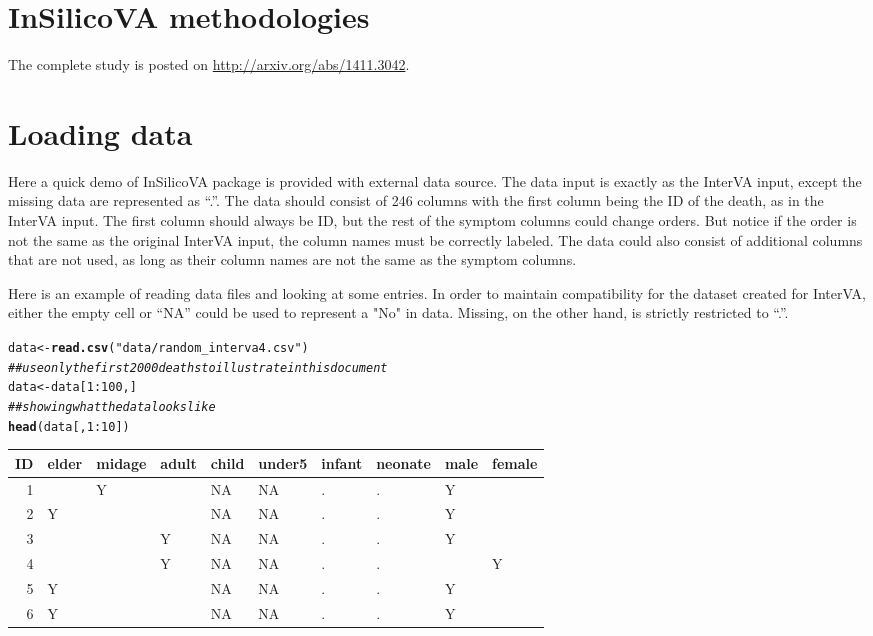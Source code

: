 \documentclass{article}\usepackage[]{graphicx}\usepackage[]{color}
\makeatletter
\newcommand{\hlnum}[1]{\textcolor[rgb]{0.686,0.059,0.569}{#1}}%
\newcommand{\hlstr}[1]{\textcolor[rgb]{0.192,0.494,0.8}{#1}}%
\newcommand{\hlcom}[1]{\textcolor[rgb]{0.678,0.584,0.686}{\textit{#1}}}%
\newcommand{\hlopt}[1]{\textcolor[rgb]{0,0,0}{#1}}%
\newcommand{\hlstd}[1]{\textcolor[rgb]{0.345,0.345,0.345}{#1}}%
\newcommand{\hlkwb}[1]{\textcolor[rgb]{0.69,0.353,0.396}{#1}}%
\newcommand{\hlkwd}[1]{\textcolor[rgb]{0.737,0.353,0.396}{\textbf{#1}}}%
\newenvironment{kframe}{%
 \def\at@end@of@kframe{}%
 \ifinner\ifhmode%
  \def\at@end@of@kframe{\end{minipage}}%
  \begin{minipage}{\columnwidth}%
 \fi\fi%
 \def\FrameCommand##1{\hskip\@totalleftmargin \hskip-\fboxsep
 \colorbox{shadecolor}{##1}\hskip-\fboxsep
     \hskip-\linewidth \hskip-\@totalleftmargin \hskip\columnwidth}%
 \MakeFramed {\advance\hsize-\width
   \@totalleftmargin\z@ \linewidth\hsize
   \@setminipage}}%
 {\par\unskip\endMakeFramed%
 \at@end@of@kframe}
\newenvironment{knitrout}{}{} %
\makeatother
\begin{document}
\section{InSilicoVA methodologies}
The complete study is posted on \url{http://arxiv.org/abs/1411.3042}.

\section{Loading data}
Here a quick demo of InSilicoVA package is provided with external data source. The data input is exactly as the InterVA input, except the missing data are represented as ``.''. The data should consist of 246 columns with the first column being the ID of the death, as in the InterVA input. The first column should always be ID, but the rest of the symptom columns could change orders. But notice if the order is not the same as the original InterVA input, the column names must be correctly labeled. The data could also consist of additional columns that are not used, as long as their column names are not the same as the symptom columns. 

Here is an example of reading data files and looking at some entries. In order to maintain compatibility for the dataset created for InterVA, either the empty cell or ``NA'' could  be used to represent a "No" in data. Missing, on the other hand, is strictly restricted to ``.''.

\begin{knitrout}
\color{fgcolor}\begin{kframe}
\begin{alltt}
\hlstd{data} \hlkwb{<-} \hlkwd{read.csv}\hlstd{(}\hlstr{"data/random_interva4.csv"}\hlstd{)}
\hlcom{## use only the first 2000 deaths to illustrate in this document}
\hlstd{data} \hlkwb{<-} \hlstd{data[}\hlnum{1}\hlopt{:}\hlnum{100}\hlstd{, ]}
\hlcom{## showing what the data looks like}
\hlkwd{head}\hlstd{(data[,} \hlnum{1}\hlopt{:}\hlnum{10}\hlstd{])}
\end{alltt}
\end{kframe}


\begin{tabular}{r|l|l|l|l|l|l|l|l|l}
\hline
ID & elder & midage & adult & child & under5 & infant & neonate & male & female\\
\hline
1 &  & Y &  & NA & NA & . & . & Y & \\
\hline
2 & Y &  &  & NA & NA & . & . & Y & \\
\hline
3 &  &  & Y & NA & NA & . & . & Y & \\
\hline
4 &  &  & Y & NA & NA & . & . &  & Y\\
\hline
5 & Y &  &  & NA & NA & . & . & Y & \\
\hline
6 & Y &  &  & NA & NA & . & . & Y & \\
\hline
\end{tabular}
\end{knitrout}
\end{document}
